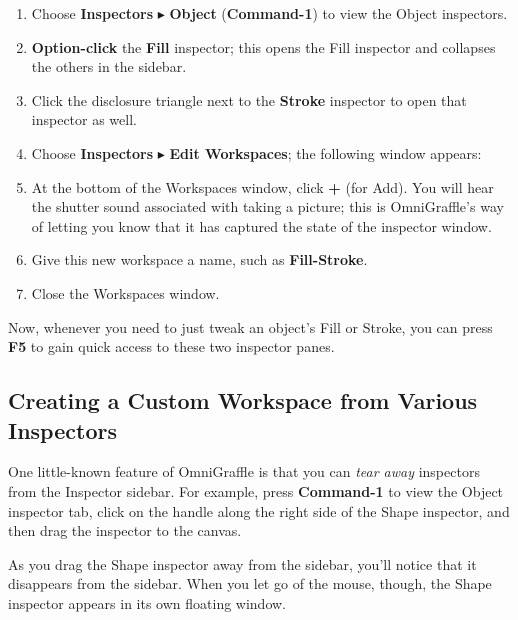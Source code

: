 \documentclass[../main.tex]{subfiles}
\begin{document}
\begin{enumerate}
  \item Choose \textbf{Inspectors} $\blacktriangleright$ \textbf{Object} (\textbf{Command-1}) to
    view the Object inspectors.
  \item \textbf{Option-click} the \textbf{Fill} inspector; this opens the Fill inspector and
    collapses the others in the sidebar.
  \item Click the disclosure triangle next to the \textbf{Stroke} inspector to open that
    inspector as well.
  \item Choose \textbf{Inspectors} $\blacktriangleright$ \textbf{Edit Workspaces}; the following
    window appears:

  \item At the bottom of the Workspaces window, click \textbf{+} (for Add). You will hear the
    shutter sound associated with taking a picture; this is OmniGraffle's way of letting you
    know that it has captured the state of the inspector window.
  \item Give this new workspace a name, such as \textbf{Fill-Stroke}.

  \item Close the Workspaces window.
\end{enumerate}

Now, whenever you need to just tweak an object's Fill or Stroke, you can press \textbf{F5} to
gain quick access to these two inspector panes.

\subsection{Creating a Custom Workspace from Various Inspectors}

One little-known feature of OmniGraffle is that you can \textit{tear away} inspectors from the
Inspector sidebar. For example, press \textbf{Command-1} to view the Object inspector tab,
click on the handle along the right side of the Shape inspector, and then drag the inspector
to the canvas.


As you drag the Shape inspector away from the sidebar, you'll notice that it disappears from the
sidebar. When you let go of the mouse, though, the Shape inspector appears in its own floating
window.

\end{document}
